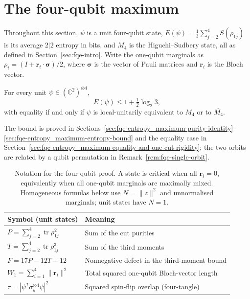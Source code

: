 \section{The four-qubit maximum}\label{sec:fqe-main}

Throughout this section, $\psi$ is a unit four-qubit state, $E(\psi)=\frac13\sum_{j=2}^4S(\rho_{1j})$ is its average
$2|2$ entropy in bits, and $M_4$ is the Higuchi--Sudbery state, all as defined in
Section~\ref{sec:fqe-intro}. Write the one-qubit marginals as
$\rho_i=(I+\mathbf r_i\cdot\boldsymbol\sigma)/2$, where $\boldsymbol\sigma$ is the vector of Pauli matrices
and $\mathbf r_i$ is the Bloch vector.

\begin{theorem}\label{thm:fqe-entropy-max} For every unit $\psi\in(\mathbb
C^2)^{\otimes4}$,
\[
E(\psi)\le 1+\tfrac12\log_2 3 ,
\]
with equality if and only if $\psi$ is local-unitarily equivalent to $M_4$ or to $\overline{M_4}$.
\end{theorem}

The bound is proved in Sections~\ref{sec:fqe-entropy_maximum-purity-identity}--\ref{sec:fqe-entropy_maximum-entropy-bound}
and the equality case in Section~\ref{sec:fqe-entropy_maximum-equality-and-one-cut-rigidity}; the two
orbits are related by a qubit permutation in Remark~\ref{rem:fqe-single-orbit}.

\begin{table}[htbp]
\centering\small
\begin{tabular}{@{}ll@{}}
\toprule
Symbol (unit states) & Meaning \\
\midrule
$P=\sum_{j=2}^4\operatorname{tr}\rho_{1j}^2$ & Sum of the cut purities \\
$T=\sum_{j=2}^4\operatorname{tr}\rho_{1j}^3$ & Sum of the third moments \\
$F=17P-12T-12$ & Nonnegative defect in the third-moment bound \\
$W_1=\sum_{i=1}^4\|\mathbf r_i\|^2$ & Total squared one-qubit Bloch-vector length \\
$\tau=|\psi^T\sigma_y^{\otimes4}\psi|^2$ & Squared spin-flip overlap (four-tangle) \\
\bottomrule
\end{tabular}
\caption{Notation for the four-qubit proof. A state is critical when all $\mathbf r_i=0$, equivalently
when all one-qubit marginals are maximally mixed. Homogeneous formulas below use $N=\|z\|^2$
and unnormalised marginals; unit states have $N=1$.}
\label{tab:fqe-moment-notation}
\end{table}

